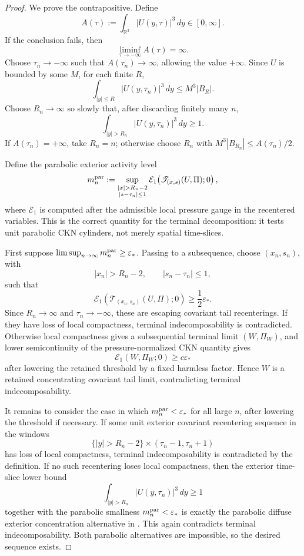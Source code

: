 \documentclass[11pt]{amsart}
\numberwithin{equation}{section}
\theoremstyle{plain}
\theoremstyle{definition}
\theoremstyle{remark}
\newcommand{\R}{\mathbb R}
\newcommand{\eps}{\varepsilon}
\newcommand{\calE}{\mathcal E}
\begin{document}
\begin{proof}
We prove the contrapositive.  Define
\[
   A(\tau):=\int_{\R^3}|U(y,\tau)|^3\,dy\in[0,\infty].
\]
If the conclusion fails, then
\[
   \liminf_{\tau\to-\infty}A(\tau)=\infty.
\]
Choose \(\tau_n\to-\infty\) such that \(A(\tau_n)\to\infty\), allowing the
value \(+\infty\).  Since \(U\) is bounded by some \(M\), for each finite
\(R\),
\[
   \int_{|y|\le R}|U(y,\tau_n)|^3\,dy\le M^3|B_R|.
\]
Choose \(R_n\to\infty\) so slowly that, after discarding finitely many \(n\),
\[
   \int_{|y|>R_n}|U(y,\tau_n)|^3\,dy\ge1.
\]
If \(A(\tau_n)=+\infty\), take \(R_n=n\); otherwise choose \(R_n\) with
\(M^3|B_{R_n}|\le A(\tau_n)/2\).

Define the parabolic exterior activity level
\[
   m_n^{\rm par}
   :=
   \sup_{\substack{|x|>R_n-2\\ |s-\tau_n|\le1}}
   \calE_1\!\left(
      \mathscr T_{(x,s)}(U,\Pi);0
   \right),
\]
where \(\calE_1\) is computed after the admissible local pressure gauge in the
recentered variables.  This is the correct quantity for the terminal
decomposition: it tests unit parabolic CKN cylinders, not merely spatial
time-slices.

First suppose \(\limsup_{n\to\infty}m_n^{\rm par}\ge\eps_*\).  Passing to a
subsequence, choose \((x_n,s_n)\), with
\[
   |x_n|>R_n-2,\qquad |s_n-\tau_n|\le1,
\]
such that
\[
   \calE_1\!\left(\mathscr T_{(x_n,s_n)}(U,\Pi);0\right)
   \ge\frac12\eps_* .
\]
Since \(R_n\to\infty\) and \(\tau_n\to-\infty\), these are escaping covariant
tail recenterings.  If they have loss of local compactness, terminal
indecomposability is contradicted.  Otherwise local compactness gives a
subsequential terminal limit \((W,\Pi_W)\), and lower semicontinuity of the
pressure-normalized CKN quantity gives
\[
   \calE_1(W,\Pi_W;0)\ge c\eps_*
\]
after lowering the retained threshold by a fixed harmless factor.  Hence \(W\)
is a retained concentrating covariant tail limit, contradicting terminal
indecomposability.

It remains to consider the case in which \(m_n^{\rm par}<\eps_*\) for all large
\(n\), after lowering the threshold if necessary.  If some unit exterior
covariant recentering sequence in the windows
\[
   \{|y|>R_n-2\}\times(\tau_n-1,\tau_n+1)
\]
has loss of local compactness, terminal indecomposability is contradicted by the
definition.  If no such recentering loses local compactness, then the exterior
time-slice lower bound
\[
   \int_{|y|>R_n}|U(y,\tau_n)|^3\,dy\ge1
\]
together with the parabolic smallness \(m_n^{\rm par}<\eps_*\) is exactly the
parabolic diffuse exterior concentration alternative in
.  This again contradicts terminal
indecomposability.  Both parabolic alternatives are impossible, so the desired
sequence exists.
\end{proof}
\end{document}
